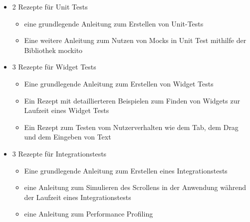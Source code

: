 \begin{itemize}
    \item 2 Rezepte für Unit Tests
    \begin{itemize} 
       \item eine grundlegende Anleitung zum Erstellen von Unit-Tests 
       \item Eine weitere Anleitung zum Nutzen von Mocks in Unit Test mithilfe der Bibliothek mockito 
    \end{itemize}
    \item 3 Rezepte für Widget Tests
    \begin{itemize} 
        \item Eine grundlegende Anleitung zum Erstellen von Widget Tests 
        \item Ein Rezept mit detaillierteren Beispielen zum Finden von Widgets  zur Laufzeit eines Widget Tests 
        \item Ein Rezept zum Testen vom Nutzerverhalten wie dem Tab, dem Drag und dem Eingeben von Text 
     \end{itemize}
    \item 3 Rezepte für Integrationstests
    \begin{itemize} 
        \item Eine grundlegende Anleitung zum Erstellen eines Integrationstests 
        \item eine Anleitung zum Simulieren des Scrollens in der Anwendung während der Laufzeit eines Integrationstests 
        \item eine Anleitung zum Performance Profiling 
     \end{itemize}
\end{itemize}
